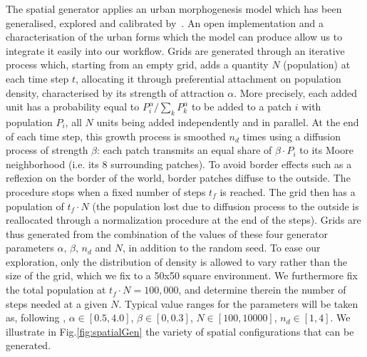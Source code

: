 \documentclass{JASSS}
\begin{document}
The spatial generator applies an urban morphogenesis model \citep{batty2007cities} which has been generalised, explored and calibrated by~\citet{raimbault2018calibration}. An open implementation and a characterisation of the urban forms which the model can produce allow us to integrate it easily into our workflow. Grids are generated through an iterative process which, starting from an empty grid, adds a quantity $N$ (population) at each time step $t$, allocating it through preferential attachment on population density, characterised by its strength of attraction $\alpha$. More precisely, each added unit has a probability equal to $P_i^{\alpha}/\sum_k P_k^{\alpha}$ to be added to a patch $i$ with population $P_i$, all $N$ units being added independently and in parallel. At the end of each time step, this growth process is smoothed $n_d$ times using a diffusion process of strength $\beta$: each patch transmits an equal share of $\beta\cdot P_i$ to its Moore neighborhood (i.e. its 8 surrounding patches). To avoid border effects such as a reflexion on the border of the world, border patches diffuse to the outside. The procedure stops when a fixed number of steps $t_f$ is reached. The grid then has a population of $t_f \cdot N$ (the population lost due to diffusion process to the outside is reallocated through a normalization procedure at the end of the steps). Grids are thus generated from the combination of the values of these four generator parameters $\alpha$, $\beta$, $n_d$ and $N$, in addition to the random seed. To ease our exploration, only the distribution of density is allowed to vary rather than the size of the grid, which we fix to a 50x50 square environment. We furthermore fix the total population at $t_f\cdot N = 100,000$, and determine therein the number of steps needed at a given $N$. Typical value ranges for the  parameters will be taken as, following \citet{raimbault2018calibration}, $\alpha\in\left[0.5,4.0\right]$, $\beta \in\left[0,0.3\right] $, $N\in \left[100,10000\right]$, $n_d\in\left[1,4\right]$. We illustrate in Fig.\ref{fig:spatialGen} the variety of spatial configurations that can be generated.
\end{document}
